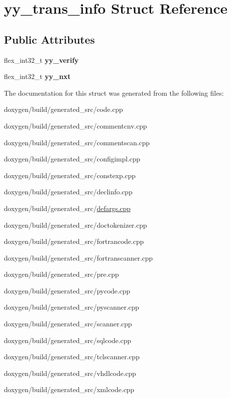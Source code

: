 \hypertarget{structyy__trans__info}{}\section{yy\+\_\+trans\+\_\+info Struct Reference}
\label{structyy__trans__info}
\subsection*{Public Attributes}
\begin{DoxyCompactItemize}
\item 
\mbox{\label{structyy__trans__info_a5c9f61e770deef50bd4e697310342fe9}} 
flex\+\_\+int32\+\_\+t {\bfseries yy\+\_\+verify}
\item 
\mbox{\label{structyy__trans__info_ae0715250c2bef261e596e77e0030f13e}} 
flex\+\_\+int32\+\_\+t {\bfseries yy\+\_\+nxt}
\end{DoxyCompactItemize}


The documentation for this struct was generated from the following files\+:\begin{DoxyCompactItemize}
\item 
doxygen/build/generated\+\_\+src/code.\+cpp\item 
doxygen/build/generated\+\_\+src/commentcnv.\+cpp\item 
doxygen/build/generated\+\_\+src/commentscan.\+cpp\item 
doxygen/build/generated\+\_\+src/configimpl.\+cpp\item 
doxygen/build/generated\+\_\+src/constexp.\+cpp\item 
doxygen/build/generated\+\_\+src/declinfo.\+cpp\item 
doxygen/build/generated\+\_\+src/\mbox{\hyperlink{defargs_8cpp}{defargs.\+cpp}}\item 
doxygen/build/generated\+\_\+src/doctokenizer.\+cpp\item 
doxygen/build/generated\+\_\+src/fortrancode.\+cpp\item 
doxygen/build/generated\+\_\+src/fortranscanner.\+cpp\item 
doxygen/build/generated\+\_\+src/pre.\+cpp\item 
doxygen/build/generated\+\_\+src/pycode.\+cpp\item 
doxygen/build/generated\+\_\+src/pyscanner.\+cpp\item 
doxygen/build/generated\+\_\+src/scanner.\+cpp\item 
doxygen/build/generated\+\_\+src/sqlcode.\+cpp\item 
doxygen/build/generated\+\_\+src/tclscanner.\+cpp\item 
doxygen/build/generated\+\_\+src/vhdlcode.\+cpp\item 
doxygen/build/generated\+\_\+src/xmlcode.\+cpp\end{DoxyCompactItemize}

